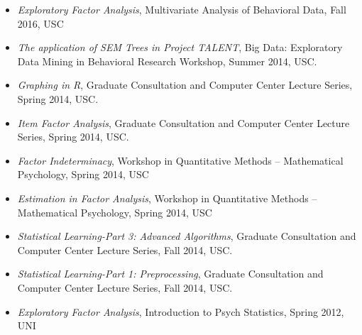 \documentclass[letterpaper,10pt]{article}
\begin{document}
\begin{itemize}
\item[] \emph{Exploratory Factor Analysis}, Multivariate Analysis of Behavioral Data, Fall 2016, USC\\
\item[] \emph{The application of SEM Trees in Project TALENT}, Big Data: Exploratory Data Mining in Behavioral Research Workshop, Summer 2014, USC.
\item[] \emph{Graphing in R}, Graduate Consultation and Computer Center Lecture Series, Spring 2014, USC.
\item[] \emph{Item Factor Analysis}, Graduate Consultation and Computer Center Lecture Series, Spring 2014, USC.
\item[] \emph{Factor Indeterminacy}, Workshop in Quantitative Methods -- Mathematical Psychology, Spring 2014, USC\\
\item[] \emph{Estimation in Factor Analysis}, Workshop in Quantitative Methods -- Mathematical Psychology, Spring 2014, USC\\
\item[] \emph{Statistical Learning-Part 3: Advanced Algorithms}, Graduate Consultation and Computer Center Lecture Series, Fall 2014, USC.
\item[] \emph{Statistical Learning-Part 1: Preprocessing}, Graduate Consultation and Computer Center Lecture Series, Fall 2014, USC.
\item[] \emph{Exploratory Factor Analysis}, Introduction to Psych Statistics, Spring 2012, UNI\\




%
\end{itemize}
\end{document}
